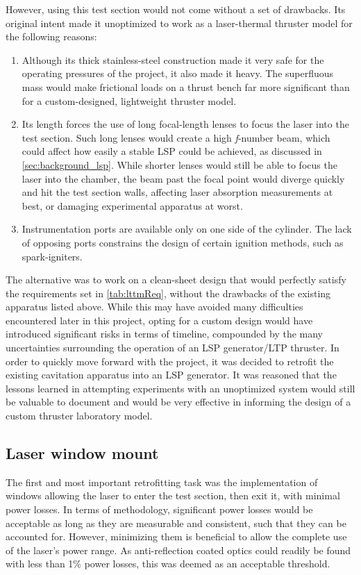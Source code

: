             However, using this test section would not come without a set of drawbacks. Its original intent made it unoptimized to work as a laser-thermal thruster model for the following reasons:
            \begin{enumerate}
                \item Although its thick stainless-steel construction made it very safe for the operating pressures of the project, it also made it heavy. The superfluous mass would make frictional loads on a thrust bench far more significant than for a custom-designed, lightweight thruster model.
                \item Its length forces the use of long focal-length lenses to focus the laser into the test section. Such long lenses would create a high {\itshape f}-number beam, which could affect how easily a stable LSP could be achieved, as discussed in \autoref{sec:background_lsp}. While shorter lenses would still be able to focus the laser into the chamber, the beam past the focal point would diverge quickly and hit the test section walls, affecting laser absorption measurements at best, or damaging experimental apparatus at worst.
                \item Instrumentation ports are available only on one side of the cylinder. The lack of opposing ports constrains the design of certain ignition methods, such as spark-igniters.
            \end{enumerate}

            The alternative was to work on a clean-sheet design that would perfectly satisfy the requirements set in \autoref{tab:lttmReq}, without the drawbacks of the existing apparatus listed above. While this may have avoided many difficulties encountered later in this project, opting for a custom design would have introduced significant risks in terms of timeline, compounded by the many uncertainties surrounding the operation of an LSP generator/LTP thruster. In order to quickly move forward with the project, it was decided to retrofit the existing cavitation apparatus into an LSP generator. It was reasoned that the lessons learned in attempting experiments with an unoptimized system would still be valuable to document and would be very effective in informing the design of a custom thruster laboratory model.

        \subsection{Laser window mount} \label{sec:design_lwm}
            The first and most important retrofitting task was the implementation of windows allowing the laser to enter the test section, then exit it, with minimal power losses. In terms of methodology, significant power losses would be acceptable as long as they are measurable and consistent, such that they can be accounted for. However, minimizing them is beneficial to allow the complete use of the laser's power range. As anti-reflection coated optics could readily be found with less than 1\% power losses, this was deemed as an acceptable threshold.

